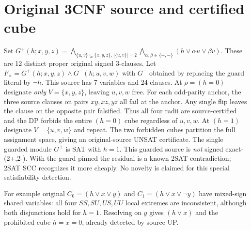 \documentclass[10pt]{article}
\begin{document}
\section{Original 3CNF source and certified cube}
Set $G^+(h;x,y,z)=
\bigwedge_{\{u,v\}\subseteq\{x,y,z\},\,|\{u,v\}|=2}
\bigwedge_{\alpha,\beta\in\{+,-\}}(h\vee\alpha u\vee\beta v)$.
These are 12 distinct proper original signed 3-clauses.
Let $F_\times=G^+(h;x,y,z)\land G^-(h;u,v,w)$
with $G^-$ obtained by replacing the guard literal by $\neg h$.
This source has 7 variables and 24 clauses.
At $\rho=(h=0)$ designate \emph{only} $V=\{x,y,z\}$, leaving
$u,v,w$ free. For each odd-parity anchor, the three source
clauses on pairs $xy,xz,yz$ all fail at the anchor. Any single
flip leaves the clause on the opposite pair falsified.
Thus all four radii are source-certified and the DP forbids
the entire $(h=0)$ cube regardless of $u,v,w$.
At $(h=1)$ designate $V=\{u,v,w\}$ and repeat. The two
forbidden cubes partition the full assignment space, giving an
original-source UNSAT certificate. The single guarded module $G^+$
is SAT with $h=1$.
This guarded source is \emph{not} signed exact-(2+,2-).
With the guard pinned the residual is a known 2SAT contradiction;
2SAT SCC recognizes it more cheaply. No novelty is claimed for
this special satisfiability detection.

For example original $C_0=(h\vee x\vee y)$ and
$C_1=(h\vee x\vee\neg y)$ have mixed-sign shared variables:
all four $SS,SU,US,UU$ local extremes are inconsistent,
although both disjunctions hold for $h=1$.
Resolving on $y$ gives $(h\vee x)$ and the prohibited
cube $h=x=0$, already detected by source UP.
\end{document}
